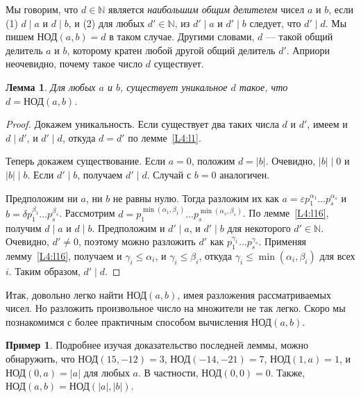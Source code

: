 \documentclass[12pt,notitlepage]{article}
\theoremstyle{plain}
\newtheorem{lemma}[thm]{Лемма}
\theoremstyle{definition}
\newtheorem{exm}[thm]{Пример}
\theoremstyle{plain}
\newcommand{\N}{\mathbb{N}}
\newcommand{\eps}{\varepsilon}
\newcommand{\1}{\mathbf{1}}
\newcommand{\0}{\mathbf{0}}
\newcommand{\dvd}{\mathop{\mid}}
\begin{document}
Мы говорим, что $d \in \N$ является \emph{наибольшим общим делителем} чисел $a$ и $b$, если (1) $d \dvd a$ и $d \dvd b$, и (2) для любых $d' \in \N$, из $d' \dvd a$ и $d' \dvd b$ следует, что $d' \dvd d$. Мы пишем $\text{НОД}(a, b) = d$ в таком случае. Другими словами, $d$ --- такой общий делитель $a$ и $b$, которому кратен любой другой общий делитель $d'$. Априори неочевидно, почему такое число $d$ существует.

\begin{lemma}
	Для любых $a$ и $b$, существует уникальное $d$ такое, что $d = \text{НОД}(a,b)$.
\end{lemma}
\begin{proof}
	Докажем уникальность. Если существует два таких числа $d$ и $d'$, имеем и $d \dvd d'$, и $d' \dvd d$, откуда $d = d'$ по лемме~\ref{L4:l1}.
	
	Теперь докажем существование. Если $a = 0$, положим $d = |b|$. Очевидно, $|b| \dvd 0$ и $|b| \dvd b$. Если $d' \dvd b$, получаем $d' \dvd d$. Случай с $b = 0$ аналогичен.
	
	Предположим ни $a$, ни $b$ не равны нулю. Тогда разложим их как $a = \eps p^{\alpha_1}_1\ldots p^{\alpha_s}_s$ и $b = \delta p^{\beta_1}_1\ldots p^{\beta_s}_s$. Рассмотрим $d = p^{\min(\alpha_1, \beta_1)}_1\ldots p^{\min(\alpha_s, \beta_s)}_s$. По лемме~\ref{L4:l16}, получим $d \dvd a$ и $d \dvd b$. Предположим и $d' \dvd a$, и $d' \dvd b$ для некоторого $d'  \in \N$. Очевидно, $d' \neq 0$, поэтому можно разложить $d'$ как $p^{\gamma_1}_1\ldots p^{\gamma_s}_s$. Применяя лемму~\ref{L4:l16}, получаем и $\gamma_i \leq \alpha_i$, и $\gamma_i \leq \beta_i$, откуда $\gamma_i \leq \min(\alpha_i, \beta_i)$ для всех $i$. Таким образом, $d' \dvd d$.
\end{proof}

Итак, довольно легко найти $\text{НОД}(a, b)$, имея разложения рассматриваемых чисел. Но разложить произвольное число на множители не так легко. Скоро мы познакомимся с более практичным способом вычисления $\text{НОД}(a, b)$.

\begin{exm}
	Подробнее изучая доказательство последней леммы, можно обнаружить, что $\text{НОД}(15, -12) = 3$, $\text{НОД}(-14, -21) = 7$, $\text{НОД}(1, a) = 1$, и $\text{НОД}(0, a) = |a|$ для любых $a$. В частности, $\text{НОД}(0, 0) = 0$. Также, $\text{НОД}(a, b) = \text{НОД}(|a|,|b|)$.
\end{exm}
\end{document}
